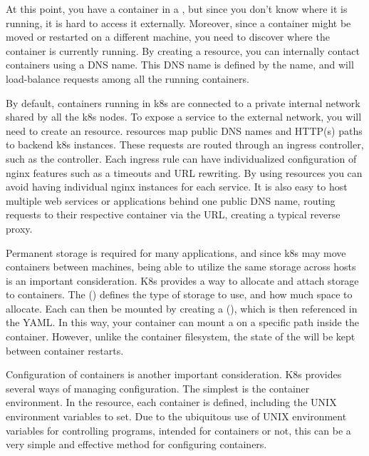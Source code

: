 \documentclass[11pt,twoside]{article}
\begin{document}
At this point, you have a container in a , but since you don't know
where it is running, it is hard to access it externally.
Moreover, since a container might be moved or restarted on a different machine, you need to discover
where the container is currently running.  By creating
a  resource, you can internally contact containers using a DNS name.
This DNS name is defined by the  name, and will load-balance
requests among all the running containers.

By default, containers running in k8s are connected to a private internal network shared by all
the k8s nodes.  To expose a service to the external network, you will need to create an 
resource.   resources map public DNS names and HTTP(s) paths
to backend k8s  instances.  These requests are routed through an ingress
controller, such as the  controller.  Each ingress rule can have
individualized configuration of nginx features such as a timeouts and URL rewriting.
By using  resources you can avoid having individual nginx instances for each service.
It is also easy to host multiple web services or applications behind one public DNS name,
routing requests to their respective container via the URL, creating a typical reverse proxy.

Permanent storage is required for many applications, and since k8s may move containers
between machines, being able to utilize the same storage across hosts is an important
consideration.  K8s provides a way to allocate and attach storage to containers.
The  () defines the type of storage to use, and how
much space to allocate.  Each  can then be mounted by creating a  (), which is then referenced in the  YAML.  In this way, your
container can mount a  on a specific path inside the container.
However, unlike the container filesystem, the state of the  will be kept
between container restarts.

Configuration of containers is another important consideration.  K8s provides several ways of
managing configuration.  The simplest is the container environment.  In the 
resource, each container is defined, including the UNIX environment variables to set.
Due to the ubiquitous use of UNIX environment variables for controlling programs, intended for
containers or not, this can be a very simple and effective method for configuring containers.
\end{document}
